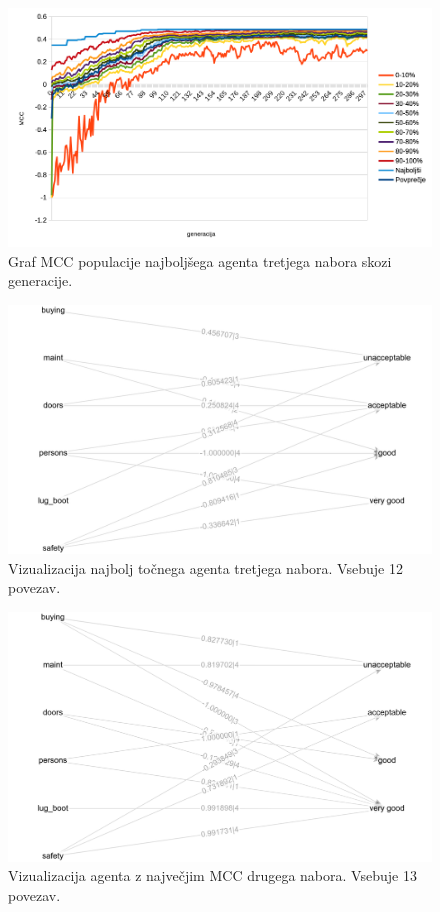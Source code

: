 \begin{figure}[H]
    \begin{center}
        \includegraphics[width=13cm]{car/3/mcc}
    \end{center}
    \caption{Graf MCC populacije najboljšega agenta tretjega nabora skozi generacije.}
    \label{fig:car_mcc_3}
\end{figure}

\begin{figure}[H]
    \begin{center}
        \includegraphics[width=13cm]{car/3/acc_g}
    \end{center}
    \caption{Vizualizacija najbolj točnega agenta tretjega nabora. Vsebuje 12 povezav.}
    \label{fig:car_acc_3_g}
\end{figure}

\begin{figure}[H]
    \begin{center}
        \includegraphics[width=13cm]{car/3/mcc_g}
    \end{center}
    \caption{Vizualizacija agenta z največjim MCC drugega nabora. Vsebuje 13 povezav.}
    \label{fig:car_mcc_3_g}
\end{figure}